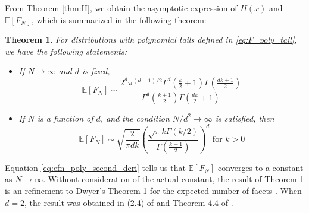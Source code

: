 \documentclass[conference,a4paper]{IEEEtran}
\def\E{\mathbb{E}}
\newtheorem{theorem}{Theorem}
\begin{document}
From Theorem \ref{thm:H}, we obtain the asymptotic
expression of $H(x)$ and $\E[F_N]$, which is
summarized in the following theorem:
\begin{theorem}\label{thm:poly_tails}
     For distributions with polynomial tails defined in \eqref{eq:F_poly_tail},
     we have the following statements:
     \begin{itemize}
          \item If $N \to \infty$ and $d$ is fixed,
\begin{equation}\label{eq:efn_poly_second_deri}
    \E[F_N] \sim \frac{2^d \pi^{(d-1)/2}\Gamma^d(\frac{k}{2}+1)
    \Gamma(\frac{dk+1}{2})}{
        \Gamma^d(\frac{k+1}{2}) \Gamma(\frac{dk}{2}+1)}
\end{equation}
\item
If $N$ is a function of $d$, and the condition $N/d^2 \to \infty$ is satisfied, then
\begin{equation}\label{eq:poly_E_F_N_d_infty}
\E[F_N] \sim \sqrt{\frac{2}{\pi dk}}\left(
      \frac{\sqrt{\pi}k \Gamma(k/2)}
     {\Gamma(\frac{k+1}{2})}
 \right)^d \textrm{ for } k>0
\end{equation}
\end{itemize}
\end{theorem}
Equation \eqref{eq:efn_poly_second_deri} tells
us that $\E[F_N]$ converges to a constant as $N \to \infty$.
Without consideration of the actual constant, the result of
Theorem \ref{thm:poly_tails} is an refinement to Dwyer's Theorem 1 for the expected number of facets \cite{dwyer1991convex}.
When $d=2$, the result was obtained in (2.4) of \cite{carnal1970konvexe}
and Theorem 4.4 of \cite{davis1987convex}.
\end{document}
